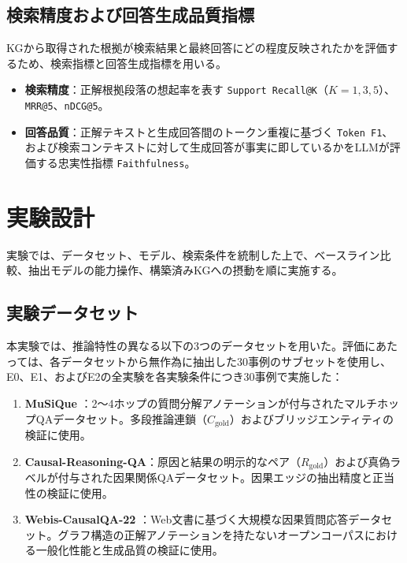 \documentclass[a4j,dvipdfmx]{jsarticle}
\begin{document}
\subsection{検索精度および回答生成品質指標}
KGから取得された根拠が検索結果と最終回答にどの程度反映されたかを評価するため、検索指標と回答生成指標を用いる。
\begin{itemize}
    \item \textbf{検索精度}：正解根拠段落の想起率を表す \texttt{Support Recall@K}（$K=1,3,5$）、\texttt{MRR@5}、\texttt{nDCG@5}。
    \item \textbf{回答品質}：正解テキストと生成回答間のトークン重複に基づく \texttt{Token F1}、および検索コンテキストに対して生成回答が事実に即しているかをLLMが評価する忠実性指標 \texttt{Faithfulness}。
\end{itemize}


\section{実験設計}

実験では、データセット、モデル、検索条件を統制した上で、ベースライン比較、抽出モデルの能力操作、構築済みKGへの摂動を順に実施する。

\subsection{実験データセット}
本実験では、推論特性の異なる以下の3つのデータセットを用いた。評価にあたっては、各データセットから無作為に抽出した30事例のサブセットを使用し、E0、E1、およびE2の全実験を各実験条件につき30事例で実施した：
\begin{enumerate}
    \item \textbf{MuSiQue} \cite{trivedi2022musique}：2〜4ホップの質問分解アノテーションが付与されたマルチホップQAデータセット。多段推論連鎖（$C_{\text{gold}}$）およびブリッジエンティティの検証に使用。
    \item \textbf{Causal-Reasoning-QA}：原因と結果の明示的なペア（$R_{\text{gold}}$）および真偽ラベルが付与された因果関係QAデータセット。因果エッジの抽出精度と正当性の検証に使用。
    \item \textbf{Webis-CausalQA-22} \cite{bondarenko2022causalqa}：Web文書に基づく大規模な因果質問応答データセット。グラフ構造の正解アノテーションを持たないオープンコーパスにおける一般化性能と生成品質の検証に使用。
\end{enumerate}
\end{document}
